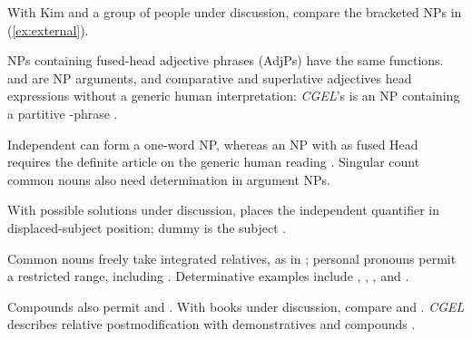 \documentclass[12pt]{article}
\begin{document}
With Kim and a group of people under discussion, compare the bracketed NPs in (\ref{ex:external}).

\begin{samepage}

\ea\label{ex:external}
\ea {}\qquad {}\qquad {}
\ex {}\qquad {}\qquad {}
\ex {}\qquad {}\qquad {}
\ex {}\qquad {}\qquad {}
\z\z

\end{samepage}

NPs containing fused-head adjective phrases (AdjPs) have the same functions.  and  are NP arguments, and comparative and superlative adjectives head expressions without a generic human interpretation: \textit{CGEL}'s  is an NP containing a partitive -phrase \citep[332--333, 416--423]{huddleston2002}.

Independent  can form a one-word NP, whereas an NP with  as fused Head requires the definite article  on the generic human reading \citep[417--418]{huddleston2002}. Singular count common nouns also need determination in argument NPs.

With possible solutions under discussion,  places the independent quantifier in displaced-subject position; dummy  is the subject \citep[1391--1393]{huddleston2002}.

Common nouns freely take integrated relatives, as in ; personal pronouns permit a restricted range, including  \citep[430]{huddleston2002}. Determinative examples include , , , and .

Compounds also permit  and . With books under discussion, compare  and . \textit{CGEL} describes relative postmodification with demonstratives and compounds \citep[414, 422--423]{huddleston2002}.
\end{document}
